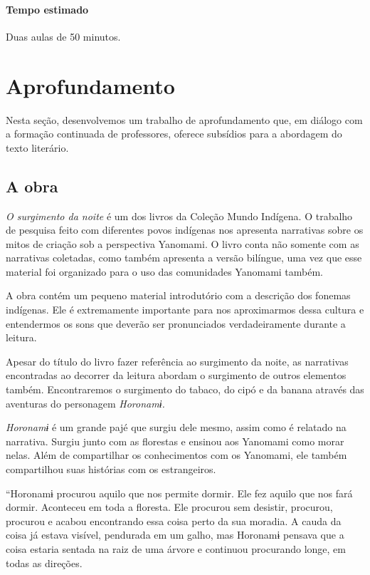 \documentclass[12pt]{extarticle}
\begin{document}
\paragraph{Tempo estimado} Duas aulas de 50 minutos.


\section{Aprofundamento}


Nesta seção, desenvolvemos um trabalho de aprofundamento que, em diálogo
com a formação continuada de professores, oferece subsídios para a
abordagem do texto literário.

\subsection{A obra}

\emph{O surgimento da noite} é um dos livros da Coleção Mundo Indígena.
O trabalho de pesquisa feito com diferentes povos indígenas nos
apresenta narrativas sobre os mitos de criação sob a perspectiva
Yanomami. O livro conta não somente com as narrativas coletadas, como
também apresenta a versão bilíngue, uma vez que esse material foi
organizado para o uso das comunidades Yanomami também.

A obra contém um pequeno material introdutório com a descrição dos
fonemas indígenas. Ele é extremamente importante para nos aproximarmos
dessa cultura e entendermos os sons que deverão ser pronunciados
verdadeiramente durante a leitura.

Apesar do título do livro fazer referência ao surgimento da noite, as
narrativas encontradas ao decorrer da leitura abordam o surgimento de
outros elementos também. Encontraremos o surgimento do tabaco, do cipó e
da banana através das aventuras do personagem \emph{Horonamɨ.}

\emph{Horonamɨ} é um grande pajé que surgiu dele mesmo, assim como é
relatado na narrativa. Surgiu junto com as florestas e ensinou aos
Yanomami como morar nelas. Além de compartilhar os conhecimentos com os
Yanomami, ele também compartilhou suas histórias com os estrangeiros.

``Horonamɨ procurou aquilo que nos permite dormir. Ele fez aquilo que nos 
fará dormir. Aconteceu em toda a floresta. Ele procurou sem desistir, procurou, 
procurou e acabou encontrando essa coisa perto da sua moradia. A cauda da coisa 
já estava visível, pendurada em um galho, mas Horonamɨ pensava que a coisa estaria 
sentada na raiz de uma árvore e continuou procurando longe, em todas as direções.
\end{document}

